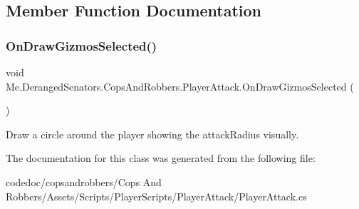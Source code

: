 \subsection{Member Function Documentation}
\mbox{\label{classMe_1_1DerangedSenators_1_1CopsAndRobbers_1_1PlayerAttack_a6d0a9e0cc8122d588767dc4593b27cef}} 
\subsubsection{\texorpdfstring{On\+Draw\+Gizmos\+Selected()}{OnDrawGizmosSelected()}}
{\footnotesize\ttfamily void Me.\+Deranged\+Senators.\+Cops\+And\+Robbers.\+Player\+Attack.\+On\+Draw\+Gizmos\+Selected (\begin{DoxyParamCaption}{ }\end{DoxyParamCaption})\hspace{0.3cm}{\ttfamily [inline]}}



Draw a circle around the player showing the attack\+Radius visually. 



The documentation for this class was generated from the following file\+:\begin{DoxyCompactItemize}
\item 
codedoc/copsandrobbers/\+Cops And Robbers/\+Assets/\+Scripts/\+Player\+Scripts/\+Player\+Attack/Player\+Attack.\+cs\end{DoxyCompactItemize}
